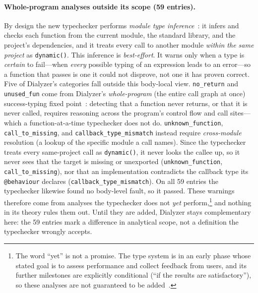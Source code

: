 \paragraph{Whole-program analyses outside its scope (59 entries).}
By design the new typechecker performs \emph{module type inference}~\cite{elixir-set-theoretic-types}: it infers and checks each function from the current module, the standard library, and the project's dependencies, and it treats every call to another module \emph{within the same project} as \texttt{dynamic()}.
This inference is \emph{best-effort}. It warns only when a type is \emph{certain} to fail---when \emph{every} possible typing of an expression leads to an error---so a function that passes is one it could not disprove, not one it has proven correct.
Five of Dialyzer's categories fall outside this body-local view.
\texttt{no\_return} and \texttt{unused\_fun} come from Dialyzer's \emph{whole-program} (the entire call graph at once) success-typing fixed point~\cite{lindahl2006practical}: detecting that a function never returns, or that it is never called, requires reasoning across the program's control flow and call sites---which a function-at-a-time typechecker does not do.
\texttt{unknown\_function}, \texttt{call\_to\_missing}, and \texttt{callback\_type\_mismatch} instead require \emph{cross-module} resolution (a lookup of the specific module a call names).
Since the typechecker treats every same-project call as \texttt{dynamic()}, it never looks the callee up, so it never sees that the target is missing or unexported (\texttt{unknown\_function}, \texttt{call\_to\_missing}), nor that an implementation contradicts the callback type its \texttt{@behaviour} declares (\texttt{callback\_type\_mismatch}).
On all 59 entries the typechecker likewise found no body-level fault, so it passed.
These warnings therefore come from analyses the typechecker does not \emph{yet} perform,\footnote{The word ``yet'' is not a promise. The type system is in an early phase whose stated goal is to assess performance and collect feedback from users, and its further milestones are explicitly conditional (``if the results are satisfactory''), so these analyses are not guaranteed to be added~\cite{elixir-set-theoretic-types}.} and nothing in its theory rules them out.
Until they are added, Dialyzer stays complementary here: the 59 entries mark a difference in analytical scope, not a definition the typechecker wrongly accepts.


